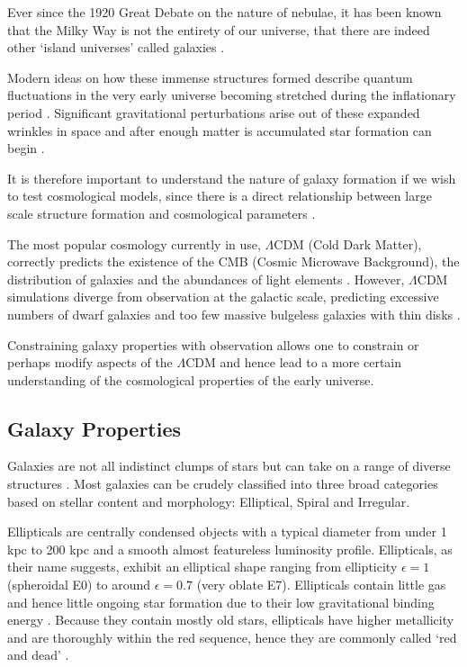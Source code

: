Ever since the 1920 Great Debate on the nature of nebulae, it has been known that the Milky Way is not the entirety of our universe, that there are indeed other `island universes' called galaxies \citep{berendzen_man_1976}. 

Modern ideas on how these immense structures formed describe quantum fluctuations in the very early universe becoming stretched during the inflationary period \citep{liddle_introduction_2003}. Significant gravitational perturbations arise out of these expanded wrinkles in space and after enough matter is accumulated star formation can begin \citep{coles_cosmology:_2002}.

It is therefore important to understand the nature of galaxy formation if we wish to test cosmological models, since there is a direct relationship between large scale structure formation and cosmological parameters \citep{binney_galactic_1998-1}.

The most popular cosmology currently in use, $\Lambda$CDM (Cold Dark Matter), correctly predicts the existence of the CMB (Cosmic Microwave Background), the distribution of galaxies and the abundances of light elements \citep{coles_cosmology:_2002}. However, $\Lambda$CDM simulations diverge from observation at the galactic scale, predicting excessive numbers of dwarf galaxies \citep{silk_massive-black-hole-velocity-dispersion_2010} and too few massive bulgeless galaxies with thin disks \citep{kormendy_bulgeless_2010}.

Constraining galaxy properties with observation allows one to constrain or perhaps modify aspects of the $\Lambda$CDM and hence lead to a more certain understanding of the cosmological properties of the early universe. 

\subsection{Galaxy Properties}
Galaxies are not all indistinct clumps of stars but can take on a range of diverse structures \citep{hubble_no._1926}. Most galaxies can be crudely classified into three broad categories based on stellar content and morphology: Elliptical, Spiral and Irregular. 

Ellipticals are centrally condensed objects with a typical diameter from under 1 kpc to 200 kpc \citep{carroll_introduction_2007} and a smooth almost featureless luminosity profile. Ellipticals, as their name suggests, exhibit an elliptical shape ranging from ellipticity $\epsilon = 1$ (spheroidal E0) to around $\epsilon = 0.7$ (very oblate E7). 
Ellipticals contain little gas and hence little ongoing star formation due to their low gravitational binding energy \citep{crocker_molecular_2011}. 
Because they contain mostly old stars, ellipticals have higher metallicity and are thoroughly within the red sequence, hence they are commonly called `red and dead' \citep{binney_galactic_1998}.  

